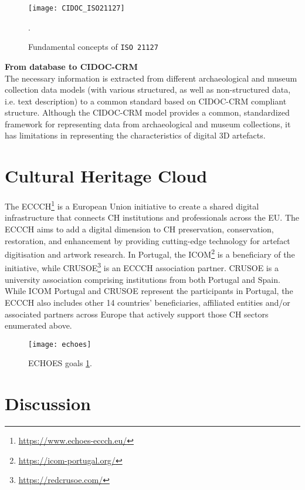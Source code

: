 \begin{figure}[h!]
    \centering
    \texttt{[image: CIDOC\_ISO21127]}
    \caption{Fundamental concepts of \texttt{ISO 21127}~\cite{doerr2007cidoc}}.
    \label{fig:cidoc}
\end{figure}

\noindent \textbf{From database to \gls{CIDOC-CRM}} \\
The necessary information is extracted from different archaeological and museum collection data models (with various structured, as well as non-structured
data, i.e. text description) to a common standard based on \gls{CIDOC-CRM} compliant structure.
Although the \gls{CIDOC-CRM} model provides a common, standardized framework for representing data from archaeological and museum collections, it has limitations in representing the characteristics of digital \gls{3D} artefacts.



\section{Cultural Heritage Cloud}
\label{sec:ch_cloud}

The \gls{ECCCH}\footnote{\label{myfootnote}\url{https://www.echoes-eccch.eu/}} is a European Union initiative 
to create a shared digital infrastructure that connects \gls{CH} institutions and professionals across the \gls{EU}.
The \gls{ECCCH} aims to add a digital dimension to \gls{CH} preservation, conservation, restoration, and enhancement 
by providing cutting-edge technology for artefact digitisation and artwork research. 
In Portugal, the \gls{ICOM}\footnote{\url{https://icom-portugal.org/}} is a beneficiary of the initiative, while \gls{CRUSOE}\footnote{\url{https://redcrusoe.com/}} is an \gls{ECCCH} association partner. \gls{CRUSOE} is a university association comprising institutions from both Portugal and Spain.
While \gls{ICOM} Portugal and \gls{CRUSOE} represent the participants in Portugal, the \gls{ECCCH} also includes other 14 countries' beneficiaries, affiliated entities and/or associated partners across Europe that actively support those \gls{CH} sectors enumerated above.


\begin{figure}[h!]
    \centering
    \texttt{[image: echoes]}
    \caption{\gls{ECHOES} goals \ref{myfootnote}.} 
    \label{fig:echoes}
\end{figure}

\section{Discussion}
\label{sec:discussion_chapter2}

